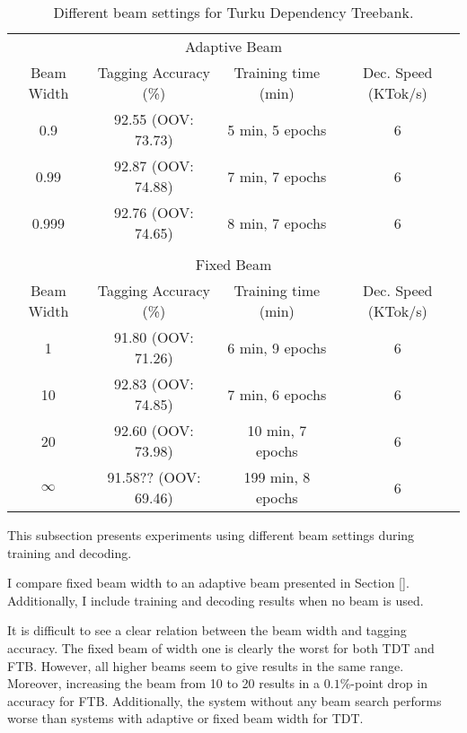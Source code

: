 \begin{table}[htb!]
\begin{center}
\begin{tabular}{cccc}
\multicolumn{4}{c}{Adaptive Beam}\\
Beam Width & Tagging Accuracy (\%) & Training time (min) & Dec. Speed (KTok/s)\\
\hline
0.9       & 92.55 (OOV: 73.73)           & 5 min, 5 epochs           & 6            \\
0.99       & 92.87 (OOV: 74.88)           & 7 min, 7 epochs            & 6            \\
0.999       & 92.76 (OOV: 74.65)            & 8 min, 7 epochs            & 6            \\
           &                  &               &               \\
\multicolumn{4}{c}{Fixed Beam}\\
Beam Width & Tagging Accuracy (\%) & Training time (min) & Dec. Speed (KTok/s) \\
\hline
1        & 91.80 (OOV: 71.26)           & 6 min, 9 epochs            & 6            \\
10       & 92.83 (OOV: 74.85)           &  7 min, 6 epochs           & 6            \\
20       & 92.60 (OOV: 73.98)           & 10 min, 7 epochs            & 6            \\
$\infty$       & 91.58??  (OOV: 69.46)          & 199 min, 8 epochs            & 6            \\
\end{tabular}
\caption{Different beam settings for Turku Dependency Treebank.}
\end{center}
\end{table}

This subsection presents experiments using different beam settings
during training and decoding. 

I compare fixed beam width to an adaptive beam presented in Section
\ref{}. Additionally, I include training and decoding results when no
beam is used.

It is difficult to see a clear relation between the beam width and
tagging accuracy. The fixed beam of width one is clearly the worst for
both TDT and FTB. However, all higher beams seem to give results in
the same range. Moreover, increasing the beam from 10 to 20 results in
a $0.1\%$-point drop in accuracy for FTB. Additionally, the system
without any beam search performs worse than systems with adaptive or
fixed beam width for TDT.

